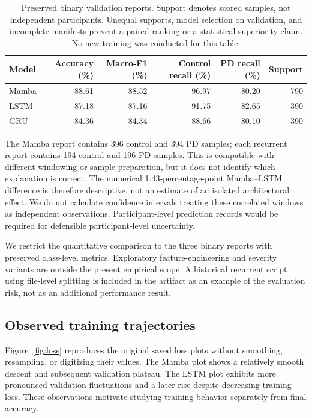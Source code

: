 \begin{table}[t]
\caption{Preserved binary validation reports. Support denotes scored samples, not independent participants. Unequal supports, model selection on validation, and incomplete manifests prevent a paired ranking or a statistical superiority claim. No new training was conducted for this table.}
\label{tab:results}
\centering
\begin{tabular}{lrrrrr}
\toprule
Model & Accuracy (\%) & Macro-F1 (\%) & Control recall (\%) & PD recall (\%) & Support\\
\midrule
Mamba & 88.61 & 88.52 & 96.97 & 80.20 & 790\\
LSTM & 87.18 & 87.16 & 91.75 & 82.65 & 390\\
GRU & 84.36 & 84.34 & 88.66 & 80.10 & 390\\
\bottomrule
\end{tabular}
\end{table}

The Mamba report contains 396 control and 394 PD samples; each recurrent report contains 194 control and 196 PD samples. This is compatible with different windowing or sample preparation, but it does not identify which explanation is correct. The numerical 1.43-percentage-point Mamba--LSTM difference is therefore descriptive, not an estimate of an isolated architectural effect. We do not calculate confidence intervals treating these correlated windows as independent observations. Participant-level prediction records would be required for defensible participant-level uncertainty.

We restrict the quantitative comparison to the three binary reports with preserved class-level metrics. Exploratory feature-engineering and severity variants are outside the present empirical scope. A historical recurrent script using file-level splitting is included in the artifact as an example of the evaluation risk, not as an additional performance result.

\subsection{Observed training trajectories}
Figure~\ref{fig:loss} reproduces the original saved loss plots without smoothing, resampling, or digitizing their values. The Mamba plot shows a relatively smooth descent and subsequent validation plateau. The LSTM plot exhibits more pronounced validation fluctuations and a later rise despite decreasing training loss. These observations motivate studying training behavior separately from final accuracy.

